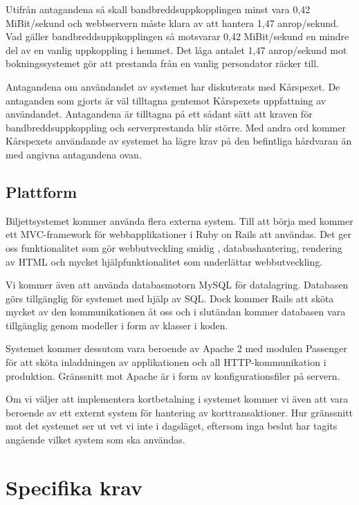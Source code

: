 \documentclass[a4paper, twoside, 11pt, titlepage]{article}
\begin{document}
	Utifrån antagandena så skall bandbreddsuppkopplingen minst vara 0,42 MiBit/sekund och webbservern måste klara av att hantera 1,47 anrop/sekund. Vad gäller bandbreddsuppkopplingen så motsvarar 0,42 MiBit/sekund en mindre del av en vanlig uppkoppling i hemmet. Det låga antalet 1,47 anrop/sekund mot bokningssystemet gör att prestanda från en vanlig persondator räcker till.

	Antagandena om användandet av systemet har diskuterats med Kårspexet. De antaganden som gjorts är väl tilltagna gentemot Kårspexets uppfattning av användandet. Antagandena är tilltagna på ett sådant sätt att kraven för bandbreddsuppkoppling och serverprestanda blir större. Med andra ord kommer Kårspexets användande av systemet ha lägre krav på den befintliga hårdvaran än med angivna antagandena ovan.

	\subsection{Plattform}


	Biljettsystemet kommer använda flera externa system. Till att börja med kommer ett MVC-framework för webbapplikationer i Ruby on Rails att användas. Det ger oss funktionalitet som gör webbutveckling smidig , databashantering, rendering av HTML och mycket hjälpfunktionalitet som underlättar webbutveckling.

	Vi kommer även att använda databasmotorn MySQL för datalagring. Databasen görs tillgänglig för systemet med hjälp av SQL. Dock kommer Rails att sköta mycket av den kommunikationen åt oss och i slutändan kommer databasen vara tillgänglig genom modeller i form av klasser i koden. 

	Systemet kommer dessutom vara beroende av Apache 2 med modulen Passenger för att sköta inladdningen av applikationen och all HTTP-kommunikation i produktion. Gränssnitt mot Apache är i form av konfigurationsfiler på servern. 

	Om vi väljer att implementera kortbetalning i systemet kommer vi även att vara beroende av ett externt system för hantering av korttransaktioner. Hur gränssnitt mot det systemet ser ut vet vi inte i dagsläget, eftersom inga beslut har tagits angående vilket system som ska användas.

\clearpage
	\section{Specifika krav}
\end{document}
